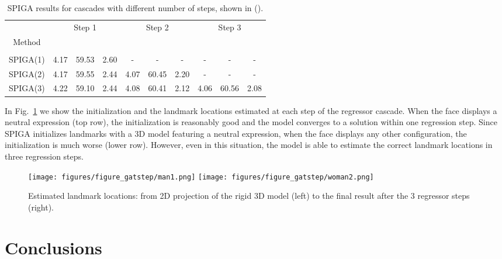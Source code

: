 \documentclass{bmvc2k}
\begin{document}
\begin{table}
\scriptsize
\begin{center}
\begin{tabular}{c|ccc|ccc|ccc}
\hline 
 & \multicolumn{3}{c}{Step 1} & \multicolumn{3}{|c}{Step 2} & \multicolumn{3}{|c}{Step 3}  \\
Method &  &  &  &  &  &  &  &  &  \\
&  &  &  &  &  &  &  &  &  \\
\hline
SPIGA(1) & 4.17 & 59.53 & 2.60 & - & - & - & - & - & - \\
SPIGA(2) & 4.17 & 59.55 & 2.44 & 4.07 & 60.45 & 2.20 & - & - & - \\
SPIGA(3) & 4.22 & 59.10 & 2.44 & 4.08 & 60.41 & 2.12 & 4.06 & 60.56 & 2.08 \\
\hline
\end{tabular}
\end{center}
\caption{SPIGA results for cascades with different number of steps, shown in ().}
\label{tab:ablation_step}
\end{table}

In Fig.~\ref{fig:regressor_steps} we show the initialization and the landmark locations estimated at each step of the regressor cascade. When the face displays a neutral expression (top row), the initialization is reasonably good and the model converges to a solution within one regression step. Since SPIGA initializes landmarks with a 3D model featuring a neutral expression, when the face displays any other configuration, the initialization is much worse (lower row). However, even in this situation, the model is able to estimate the correct landmark locations in three regression steps. 

\begin{figure}
    \centering
    \texttt{[image: figures/figure\_gatstep/man1.png]}
    \texttt{[image: figures/figure\_gatstep/woman2.png]}
    \caption{Estimated landmark locations: from 2D projection of the rigid 3D model (left) to the final result after the 3 regressor steps (right).}
    \label{fig:regressor_steps}
\end{figure}


\section{Conclusions}
\label{sec:conclussions}
\end{document}
